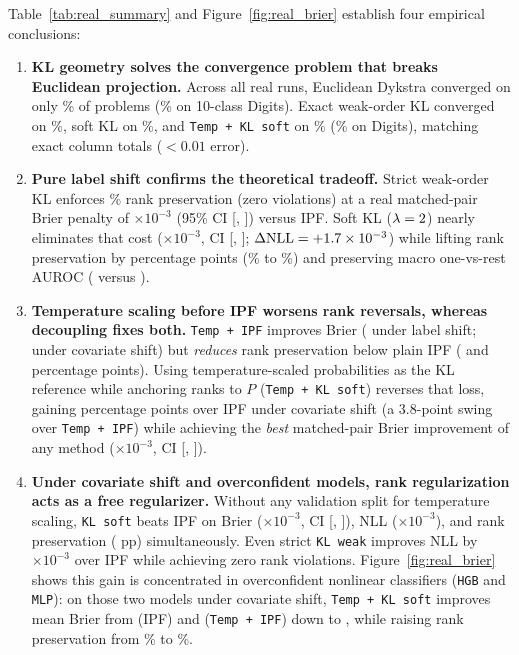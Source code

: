 \documentclass[11pt]{article}
\begin{document}
Table~\ref{tab:real_summary} and Figure~\ref{fig:real_brier} establish four empirical conclusions:
\begin{enumerate}[leftmargin=*,itemsep=2pt]
\item \textbf{KL geometry solves the convergence problem that breaks Euclidean projection.} Across all \NumTotalRealRuns{} real runs, Euclidean Dykstra converged on only \RealEucConvPct\% of problems (\DigitsEucConvPct\% on 10-class Digits). Exact weak-order KL converged on \RealKlWeakConvPct\%, soft KL on \RealKlSoftConvPct\%, and \texttt{Temp + KL soft} on \RealTempKlSoftConvPct\% (\DigitsKlSoftConvPct\% on Digits), matching exact column totals ($<0.01$ error).
\item \textbf{Pure label shift confirms the theoretical tradeoff.} Strict weak-order KL enforces \LabKlWeakRank{}\% rank preservation (zero violations) at a real matched-pair Brier penalty of \LabKlWeakDBrier{}$\times 10^{-3}$ (95\% CI [\LabKlWeakDBrierLo{}, \LabKlWeakDBrierHi{}]) versus IPF. Soft KL ($\lambda=2$) nearly eliminates that cost (\LabKlSoftDBrier{}$\times 10^{-3}$, CI [\LabKlSoftDBrierLo{}, \LabKlSoftDBrierHi{}]; $\Delta\text{NLL} = +1.7{}\times 10^{-3}$) while lifting rank preservation by \LabKlSoftDRank{} percentage points (\LabIpfRank{}\% to \LabKlSoftRank{}\%) and preserving macro one-vs-rest AUROC (\LabKlSoftAuroc{} versus \LabIpfAuroc{}).
\item \textbf{Temperature scaling before IPF worsens rank reversals, whereas decoupling fixes both.} \texttt{Temp + IPF} improves Brier (\LabTempIpfDBrier{} under label shift; \CovTempIpfDBrier{} under covariate shift) but \emph{reduces} rank preservation below plain IPF (\LabTempIpfDRank{} and \CovTempIpfDRank{} percentage points). Using temperature-scaled probabilities as the KL reference while anchoring ranks to $P$ (\texttt{Temp + KL soft}) reverses that loss, gaining \CovTempKlSoftDRank{} percentage points over IPF under covariate shift (a 3.8-point swing over \texttt{Temp + IPF}) while achieving the \emph{best} matched-pair Brier improvement of any method (\CovTempKlSoftDBrier{}$\times 10^{-3}$, CI [\CovTempKlSoftDBrierLo{}, \CovTempKlSoftDBrierHi{}]).
\item \textbf{Under covariate shift and overconfident models, rank regularization acts as a free regularizer.} Without any validation split for temperature scaling, \texttt{KL soft} beats IPF on Brier (\CovKlSoftDBrier{}$\times 10^{-3}$, CI [\CovKlSoftDBrierLo{}, \CovKlSoftDBrierHi{}]), NLL (\CovKlSoftDNll{}$\times 10^{-3}$), and rank preservation (\CovKlSoftDRank{} pp) simultaneously. Even strict \texttt{KL weak} improves NLL by \CovKlWeakDNll{}$\times 10^{-3}$ over IPF while achieving zero rank violations. Figure~\ref{fig:real_brier} shows this gain is concentrated in overconfident nonlinear classifiers (\texttt{HGB} and \texttt{MLP}): on those two models under covariate shift, \texttt{Temp + KL soft} improves mean Brier from \CovOverIpfBrier{} (IPF) and \CovOverTempIpfBrier{} (\texttt{Temp + IPF}) down to \CovOverTempKlSoftBrier{}, while raising rank preservation from \CovOverTempIpfRank{}\% to \CovOverTempKlSoftRank{}\%.
\end{enumerate}
\end{document}
